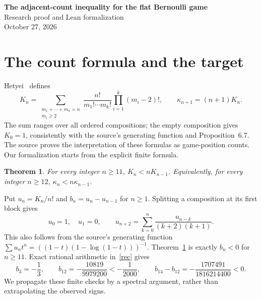 \documentclass[11pt]{article}
\newtheorem{theorem}{Theorem}
\begin{document}
\begin{center}
{\Large\bfseries The adjacent-count inequality for the flat Bernoulli game}\\[.5em]
Research proof and Lean formalization\\
October 27, 2026
\end{center}
\begin{abstract}
We prove the adjacent-count inequality in Hetyei's Conjecture~6.10.
After factorial normalization, the counting sequence is a renewal sequence
whose increments are negative from index 11 onward. Finite symmetric
arrowhead matrices realize approximating moments. Their spectrum has one
negative value, and positive-weight power inequalities propagate three exact
coefficient checks to the entire tail. Classical finite power sums identify
the limiting coefficients. The Lean proof includes the source's finite
ordered-composition formula and all spectral, recurrence and limit bridges.
\end{abstract}

\section{The count formula and the target}
Hetyei~\cite[(16), Conjecture~6.10]{H} defines
\begin{equation}\label{counts}
 K_n=\sum_{\substack{m_1+\cdots+m_k=n\\m_i\ge2}}
       \frac{n!}{m_1!\cdots m_k!}\prod_{i=1}^k(m_i-2)!,
 \qquad \kappa_{n+1}=(n+1)K_n.
\end{equation}
The sum ranges over all ordered compositions; the empty composition gives
$K_0=1$, consistently with the source's generating function and
Proposition~6.7. The source proves the interpretation of these formulas as
game-position counts. Our formalization starts from the explicit finite formula.
\begin{theorem}\label{main}
For every integer $n\ge11$, $K_n<nK_{n-1}$. Equivalently, for every
integer $n\ge12$, $\kappa_n<n\kappa_{n-1}$.
\end{theorem}
Put $u_n=K_n/n!$ and $b_n=u_n-u_{n-1}$ for $n\ge1$.
Splitting a composition at its first block gives
\begin{equation}\label{rec}
 u_0=1,\quad u_1=0,\qquad
 u_{n+2}=\sum_{k=0}^{n}\frac{u_{n-k}}{(k+2)(k+1)}.
\end{equation}
This also follows from the source's generating function
$\sum u_nt^n=((1-t)(1-\log(1-t)))^{-1}$.
Theorem~\ref{main} is exactly $b_n<0$ for $n\ge11$.
Exact rational arithmetic in~\eqref{rec} gives
\begin{equation}\label{base}
 b_3=-\frac13,\qquad b_{12}=-\frac{10819}{9979200}<-\frac1{2000},
 \qquad b_{14}-b_{12}=-\frac{1707491}{1816214400}<0.
\end{equation}
We propagate these finite checks by a spectral argument, rather than
extrapolating the observed signs.
\end{document}
